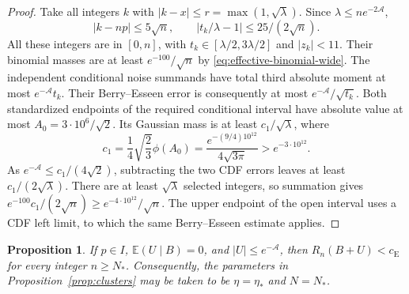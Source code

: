 \documentclass[aop]{imsart}
\theoremstyle{plain}
\newtheorem{proposition}[theorem]{Proposition}
\theoremstyle{definition}
\theoremstyle{definition}
\newcommand{\EE}{\mathbb E}
\newcommand{\ce}{c_{\mathrm E}}
\begin{document}
\begin{proof}
Take all integers $k$ with $|k-x|\le r=\max(1,\sqrt\lambda)$.
Since $\lambda\le ne^{-2\mathcal A}$,
\[
 |k-np|\le5\sqrt n,\qquad
 |t_k/\lambda-1|\le25/(2\sqrt n).
\]
All these integers are in $[0,n]$, with
$t_k\in[\lambda/2,3\lambda/2]$ and $|z_k|<11$.
Their binomial masses are at least $e^{-100}/\sqrt n$ by
\eqref{eq:effective-binomial-wide}.
The independent conditional noise summands have total third
absolute moment at most $e^{-\mathcal A}t_k$.  Their Berry--Esseen
error is consequently at most $e^{-\mathcal A}/\sqrt{t_k}$.
Both standardized endpoints of the required conditional interval
have absolute value at most
$A_0=3\cdot10^6/\sqrt2$.
Its Gaussian mass is at least $c_1/\sqrt\lambda$, where
\[
 c_1=\frac14\sqrt{\frac23}\phi(A_0)
 =\frac{e^{-(9/4)10^{12}}}{4\sqrt{3\pi}}
 >e^{-3\cdot10^{12}}.
\]
As $e^{-\mathcal A}\le c_1/(4\sqrt2)$, subtracting the two CDF
errors leaves at least $c_1/(2\sqrt\lambda)$.
There are at least $\sqrt\lambda$ selected integers, so summation
gives $e^{-100}c_1/(2\sqrt n)\ge e^{-4\cdot10^{12}}/\sqrt n$.
The upper endpoint of the open interval uses a CDF left limit,
to which the same Berry--Esseen estimate applies.
\end{proof}

\begin{proposition}\label{prop:effective-clusters}
If $p\in I$, $\EE(U\mid B)=0$, and $|U|\le e^{-\mathcal A}$, then
$R_n(B+U)<\ce$ for every integer $n\ge N_*$.
Consequently, the parameters in Proposition~\ref{prop:clusters}
may be taken to be $\eta=\eta_*$ and $N=N_*$.
\end{proposition}
\end{document}

